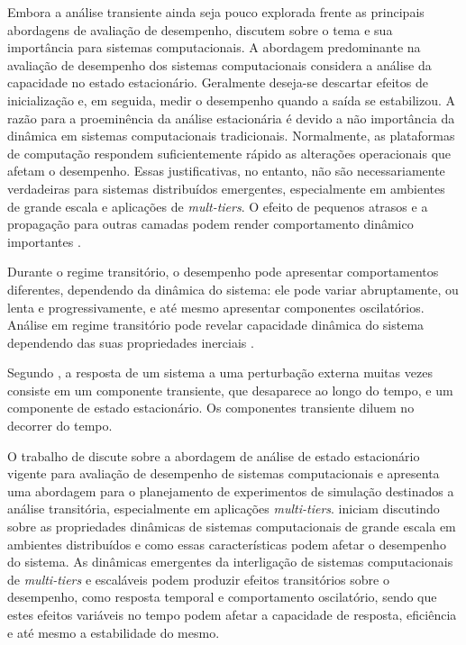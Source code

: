 Embora a análise transiente ainda seja pouco explorada frente as principais abordagens de avaliação de desempenho,  discutem sobre o tema e sua importância para sistemas computacionais. A abordagem predominante na avaliação de desempenho dos sistemas computacionais considera a análise da capacidade no estado estacionário. Geralmente deseja-se descartar efeitos de inicialização e, em seguida, medir o desempenho quando a saída se estabilizou. A razão para a proeminência da análise estacionária é devido a não importância da dinâmica em sistemas computacionais tradicionais. Normalmente, as plataformas de computação respondem suficientemente rápido as alterações operacionais que afetam o desempenho. Essas justificativas, no entanto, não são necessariamente verdadeiras para sistemas distribuídos emergentes, especialmente em ambientes de grande escala e aplicações de \textit{mult-tiers}. O efeito de pequenos atrasos e a propagação para outras camadas podem render comportamento dinâmico importantes \cite{Lourenco2015}.

Durante o regime transitório, o desempenho pode apresentar comportamentos diferentes, dependendo da dinâmica do sistema: ele pode variar abruptamente, ou lenta e progressivamente, e até mesmo apresentar componentes oscilatórios. Análise em regime transitório pode revelar capacidade dinâmica do sistema dependendo das suas propriedades inerciais \cite{Lourenco2015}.

Segundo , a resposta de um sistema a uma perturbação externa muitas vezes consiste em um componente transiente, que desaparece ao longo do tempo, e um componente de estado estacionário. Os componentes transiente diluem no decorrer do tempo. 

O trabalho de  discute sobre a abordagem de análise de estado estacionário vigente para avaliação de desempenho de sistemas computacionais e apresenta uma abordagem para o planejamento de experimentos de simulação destinados a análise transitória, especialmente em aplicações \textit{multi-tiers}.
 iniciam discutindo sobre as propriedades dinâmicas de sistemas computacionais de grande escala em ambientes distribuídos e como essas características podem afetar o desempenho do sistema. As dinâmicas emergentes da interligação de sistemas computacionais de \textit{multi-tiers} e escaláveis podem produzir efeitos transitórios sobre o desempenho, como resposta temporal e comportamento oscilatório, sendo que estes efeitos variáveis no tempo podem afetar a capacidade de resposta, eficiência e até mesmo a estabilidade do mesmo. 

